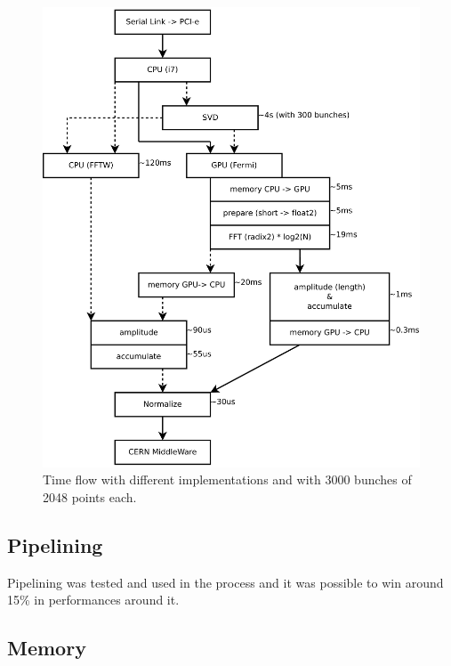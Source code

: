 \begin{figure}
\caption{Time flow with different implementations and with 3000 bunches of 
2048 points each.}
\centering
\includegraphics[scale=0.4]{PC-flow.pdf}
\end{figure}

   \subsection{Pipelining}

   Pipelining was tested and used in the process and it was possible to
   win around 15\% in performances around it.

   \subsection{Memory}

